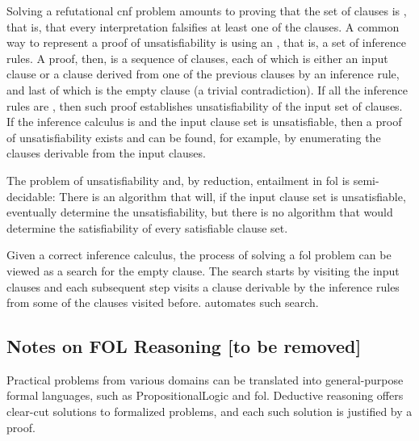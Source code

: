 Solving a refutational \gls{cnf} problem amounts to proving that the set of clauses is ,
that is, that every interpretation falsifies at least one of the clauses.
A common way to represent a proof of unsatisfiability is using an ,
that is, a set of inference rules.
A proof, then, is a sequence of clauses,
each of which is either an input clause or a clause derived from one of the previous clauses by an inference rule, and
last of which is the empty clause (a trivial contradiction).
If all the inference rules are , then such proof establishes unsatisfiability of the input set of clauses.
If the inference calculus is  and the input clause set is unsatisfiable,
then a proof of unsatisfiability exists and can be found, for example, by enumerating the clauses derivable from the input clauses.


The problem of unsatisfiability and, by reduction, entailment in \gls{fol} is semi-decidable:
There is an algorithm that will, if the input clause set is unsatisfiable, eventually determine the unsatisfiability,
but there is no algorithm that would determine the satisfiability of every satisfiable clause set.

Given a correct inference calculus, the process of solving a \gls{fol} problem can be viewed as a search for the empty clause.
The search starts by visiting the input clauses and
each subsequent step visits a clause derivable by the inference rules from some of the clauses visited before.
 automates such search.

\subsection{Notes on FOL Reasoning [to be removed]}


Practical problems from various domains can be translated into general-purpose formal languages,
such as \gls{PropositionalLogic} and \gls{fol}.
Deductive reasoning offers clear-cut solutions to formalized problems,
and each such solution is justified by a proof.

